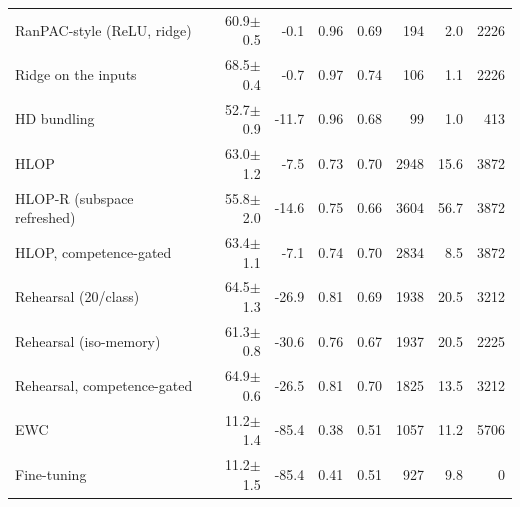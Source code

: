 \begin{tabular}{lrrrrrrr}
RanPAC-style (ReLU, ridge) & 60.9{\tiny$\pm$0.5} & -0.1 & 0.96 & 0.69 & 194 & 2.0 & 2226 \\
Ridge on the inputs & 68.5{\tiny$\pm$0.4} & -0.7 & 0.97 & 0.74 & 106 & 1.1 & 2226 \\
HD bundling & 52.7{\tiny$\pm$0.9} & -11.7 & 0.96 & 0.68 & 99 & 1.0 & 413 \\
HLOP & 63.0{\tiny$\pm$1.2} & -7.5 & 0.73 & 0.70 & 2948 & 15.6 & 3872 \\
HLOP-R (subspace refreshed) & 55.8{\tiny$\pm$2.0} & -14.6 & 0.75 & 0.66 & 3604 & 56.7 & 3872 \\
HLOP, competence-gated & 63.4{\tiny$\pm$1.1} & -7.1 & 0.74 & 0.70 & 2834 & 8.5 & 3872 \\
Rehearsal (20/class) & 64.5{\tiny$\pm$1.3} & -26.9 & 0.81 & 0.69 & 1938 & 20.5 & 3212 \\
Rehearsal (iso-memory) & 61.3{\tiny$\pm$0.8} & -30.6 & 0.76 & 0.67 & 1937 & 20.5 & 2225 \\
Rehearsal, competence-gated & 64.9{\tiny$\pm$0.6} & -26.5 & 0.81 & 0.70 & 1825 & 13.5 & 3212 \\
EWC & 11.2{\tiny$\pm$1.4} & -85.4 & 0.38 & 0.51 & 1057 & 11.2 & 5706 \\
Fine-tuning & 11.2{\tiny$\pm$1.5} & -85.4 & 0.41 & 0.51 & 927 & 9.8 & 0 \\
\bottomrule
\end{tabular}
